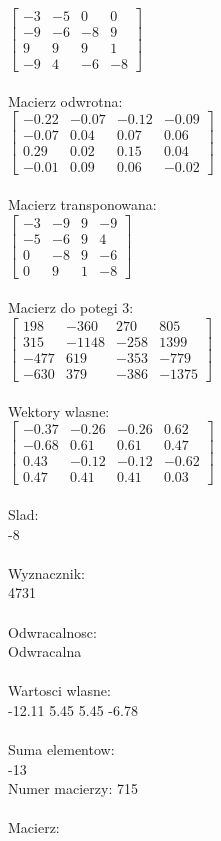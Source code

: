 \documentclass[a4paper,12pt]{article}
\begin{document}
$\begin{bmatrix} -3&-5&0&0\\-9&-6&-8&9\\9&9&9&1\\-9&4&-6&-8 \end{bmatrix}$
\\
\\
Macierz odwrotna:\\

$\begin{bmatrix} -0.22&-0.07&-0.12&-0.09\\-0.07&0.04&0.07&0.06\\0.29&0.02&0.15&0.04\\-0.01&0.09&0.06&-0.02 \end{bmatrix}$
\\
\\
Macierz transponowana:\\

$\begin{bmatrix} -3&-9&9&-9\\-5&-6&9&4\\0&-8&9&-6\\0&9&1&-8 \end{bmatrix}$
\\
\\
Macierz do potegi 3:\\

$\begin{bmatrix} 198&-360&270&805\\315&-1148&-258&1399\\-477&619&-353&-779\\-630&379&-386&-1375 \end{bmatrix}$
\\
\\
Wektory wlasne:\\

$\begin{bmatrix} -0.37&-0.26&-0.26&0.62\\-0.68&0.61&0.61&0.47\\0.43&-0.12&-0.12&-0.62\\0.47&0.41&0.41&0.03 \end{bmatrix}$
\\
\\
Slad:\\
-8
\\
\\
Wyznacznik:\\
4731
\\
\\
Odwracalnosc:\\
Odwracalna
\\
\\
Wartosci wlasne:\\
-12.11 5.45 5.45 -6.78
\\
\\
Suma elementow:\\
-13
\\
\newpage
Numer macierzy:
715
\\
\\
Macierz:\\
\end{document}
